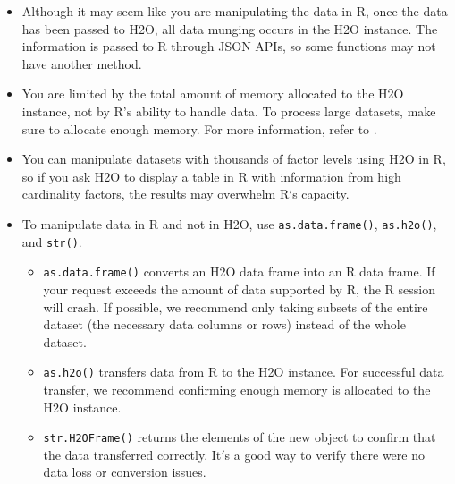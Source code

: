 {{\begin{itemize}
\item Although it may seem like you are manipulating the data in R, once the data has been passed to H2O, all data munging occurs in the H2O instance. The information is passed to R through JSON APIs, so some functions may not have another method.
\item You are limited by the total amount of memory allocated to the H2O instance, not by R's ability to handle data. To process large datasets, make sure to allocate enough memory. For more information, refer to {\textbf{}}.
\item You can manipulate datasets with thousands of factor levels using H2O in R, so if you ask H2O to display a table in R with information from high cardinality factors, the results may overwhelm R`s capacity.
\item To manipulate data in R and not in H2O, use {\texttt{as.data.frame()}}, {\texttt{as.h2o()}}, and {\texttt{str()}}. \begin{itemize}
\item {\texttt{as.data.frame()}} converts an H2O data frame into an R data frame. If your request exceeds the amount of data supported by R, the R session will crash. If possible, we recommend only taking subsets of the entire dataset (the necessary data columns or rows) instead of the whole dataset.
\item {\texttt{as.h2o()}} transfers data from R to the H2O instance. For successful data transfer, we recommend confirming enough memory is allocated to the H2O instance.
\item {\texttt{str.H2OFrame()}} returns the elements of the new object to confirm that the data transferred correctly. It$'$s a good way to verify there were no data loss or conversion issues. %
\end{itemize}
\end{itemize}



}}
